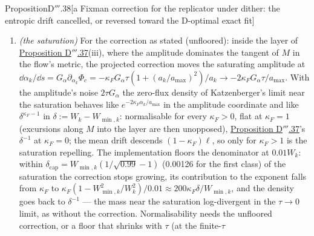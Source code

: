 \begin{thm}{Proposition}{D$'''$.38}[a Fixman correction for the replicator under dither: the entropic drift cancelled,
or reversed toward the D-optimal exact fit]
\begin{enumerate}[label=\textup{(\roman*)}]
    unique maximiser $W^\sharp$ on the simplex, interior --- the exact fit whose positions' Hessian has the largest
    determinant (D-optimal; the condition number along $M$ is nearly flat and minimised elsewhere), the repelling node
    of \hyperref[res:thmDppp:37]{Proposition D$'''$.37}'s drift ---, and in the slow-replicator limit the masses
    converge to it, deterministically on the time scale $1/((\kappa_F - 1)\gamma\tau)$, their spread there
    $O(\sqrt{\gamma/(\kappa_F - 1)})$. With an estimate $\hat\tau$ of the dither's level in the correction the net
    potential is $(\kappa_F\hat\tau/\tau - 1)(\tau/2)\ell$: the selection needs only $\kappa_F\hat\tau > \tau$ --- and
    $\hat\tau$ can be read from the rms fit error by equipartition, $\hat\tau = m\langle F^2\rangle\langle e^2\rangle/p$
    with $p$ the position coordinates holding fit energy (each stores $\tau/2$ of $J = (m/2)\langle r^2\rangle$; the
    mean of $e$ is biased low by Jensen's inequality).
  \item \emph{(the saturation)} For the correction as stated (unfloored): inside the layer of
    \hyperref[res:thmDppp:37]{Proposition D$'''$.37}(iii), where the amplitude dominates the tangent of $M$ in the
    flow's metric, the projected correction moves the saturating amplitude at
    $\dd\alpha_k/\dd s = G_\alpha\partial_{\alpha_k}\Phi_c = -\kappa_FG_\alpha\tau(1 + (a_k/a_{\max})^2)/a_k
    \to-2\kappa_FG_\alpha\tau/a_{\max}$. With the amplitude's noise $2\tau G_\alpha$ the zero-flux density of
    Katzenberger's limit near the saturation behaves like $e^{-2\kappa_F\alpha_k/a_{\max}}$ in the amplitude coordinate
    and like $\delta^{\kappa_F - 1}$ in $\delta := W_k - W_{\min,k}$: normalisable for every $\kappa_F > 0$, flat at
    $\kappa_F = 1$ (excursions along $M$ into the layer are then unopposed),
    \hyperref[res:thmDppp:37]{Proposition D$'''$.37}'s $\delta^{-1}$ at $\kappa_F = 0$; the mean drift descends
    $(1 - \kappa_F)\ell$, so only for $\kappa_F > 1$ is the saturation repelling. The implementation floors the
    denominator at $0.01W_k$: within $\delta_{\mathrm{cap}} = W_{\min,k}(1/\sqrt{0.99} - 1)$ (0.00126 for the first
    class) of the saturation the correction stops growing, its contribution to the exponent falls from $\kappa_F$ to
    $\kappa_F(1 - W_{\min,k}^2/W_k^2)/0.01\approx200\kappa_F\delta/W_{\min,k}$, and the density goes back to
    $\delta^{-1}$ --- the mass near the saturation log-divergent in the $\tau\to0$ limit, as without the correction.
    Normalisability needs the unfloored correction, or a floor that shrinks with $\tau$ (at the finite-$\tau$

\end{enumerate}
\end{thm}
